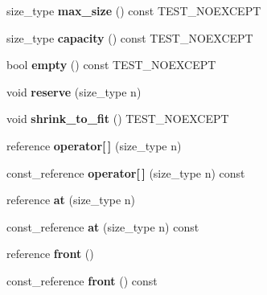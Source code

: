 \begin{DoxyCompactItemize}
size\+\_\+type {\bfseries max\+\_\+size} () const T\+E\+S\+T\+\_\+\+N\+O\+E\+X\+C\+E\+PT
\item 
\mbox{\label{classnasty__vector_a58c14b30ea8022b7b0210f6a6409c688}} 
size\+\_\+type {\bfseries capacity} () const T\+E\+S\+T\+\_\+\+N\+O\+E\+X\+C\+E\+PT
\item 
\mbox{\label{classnasty__vector_a05c2a475a4896acb013337df636a310b}} 
bool {\bfseries empty} () const T\+E\+S\+T\+\_\+\+N\+O\+E\+X\+C\+E\+PT
\item 
\mbox{\label{classnasty__vector_a7bb954f68975d0c12227af97687c3ec4}} 
void {\bfseries reserve} (size\+\_\+type n)
\item 
\mbox{\label{classnasty__vector_ad5e5ebfdcec71b20ae351bfc8b7f5b3d}} 
void {\bfseries shrink\+\_\+to\+\_\+fit} () T\+E\+S\+T\+\_\+\+N\+O\+E\+X\+C\+E\+PT
\item 
\mbox{\label{classnasty__vector_a8169ebd3a217217d8b15652c757cbf32}} 
reference {\bfseries operator\mbox{[}$\,$\mbox{]}} (size\+\_\+type n)
\item 
\mbox{\label{classnasty__vector_a9e01f6402a079beeae42e28cd66d9042}} 
const\+\_\+reference {\bfseries operator\mbox{[}$\,$\mbox{]}} (size\+\_\+type n) const
\item 
\mbox{\label{classnasty__vector_a402ae53bc9e07590a67096403464a2a6}} 
reference {\bfseries at} (size\+\_\+type n)
\item 
\mbox{\label{classnasty__vector_aa6f5cf01c94d3e29de0d9ee7524a225b}} 
const\+\_\+reference {\bfseries at} (size\+\_\+type n) const
\item 
\mbox{\label{classnasty__vector_af31fa11212a7ebb6e3ca315aa06a0c30}} 
reference {\bfseries front} ()
\item 
\mbox{\label{classnasty__vector_a2a037bb0d375e0c9657552dfca767798}} 
const\+\_\+reference {\bfseries front} () const
\item 
\mbox{\label{classnasty__vector_a1c8d4b61eb28238982b9a9543240a8e3}} 

\end{DoxyCompactItemize}
